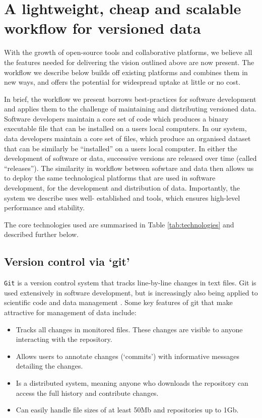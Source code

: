 \documentclass[a4paper,11pt]{article}
\begin{document}

\section{A lightweight, cheap and scalable workflow for versioned data}

With the growth of open-source tools and collaborative platforms, we believe
all the features needed for delivering the vision outlined above are now
present. The workflow we describe below builds off existing platforms and
combines them in new ways, and offers the potential for
widespread uptake at little or no cost.

In brief, the workflow we present borrows best-practices for software
development  and applies them to the challenge of maintaining and distributing
versioned data. Software developers maintain a core set of code which produces
a binary executable file that can be installed on a users local  computers. In
our system, data developers maintain a core set of files, which produce an
organised dataset that can be similarly be ``installed'' on a users local
computer. In either the development of software or data, successive versions
are released over time (called ``releases''). The similarity in workflow
between sofwtare and data then allows us to deploy the same technological
platforms that are used in software development, for the development and
distribution of data. Importantly, the system we describe uses well-
established and tools, which ensures high-level performance and stability.

The core technologies used are summarised in Table \ref{tab:technologies} and
described further below.

\subsection{Version control via `git'}

\texttt{Git} is a version control system that tracks line-by-line changes in text
files. Git is used extensively in software development, but is increasingly
also being applied to scientific code and data management \citep{Ram-2013,
Perkel-2016}. Some key features of git that make attractive for management of data
include:
\begin{itemize}
  \item Tracks all changes in monitored files. These changes are visible to
  anyone interacting with the repository.
  \item Allows users to annotate changes (`commits') with informative messages
  detailing the changes.
  \item Is a distributed system, meaning anyone who downloads the repository
  can access the full history and contribute changes.
  \item Can easily handle file sizes of at least 50Mb and repositories up to 1Gb.
\end{itemize}
\end{document}
